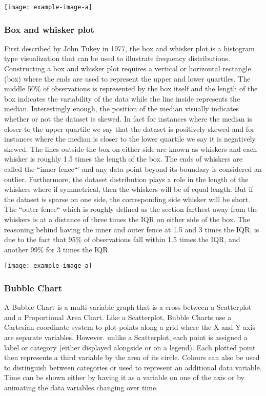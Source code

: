 \texttt{[image: example-image-a]} 

\subsubsection{Box and whisker plot}
First described by John Tukey in 1977, the box and whisker plot is a histogram
type visualization that can be used to illustrate frequency distributions. Constructing
a box and whisker plot requires a vertical or horizontal rectangle (box) where the 
ends are used to represent the upper and lower quartiles. The middle 50\% of observations 
is represented by the box itself and the length of the box indicates the variability 
of the data while the line inside represents the median. Interestingly enough, 
the position of the median visually indicates whether or not the dataset is skewed. 
In fact for instances where the median is closer to the upper quartile we say that 
the dataset is positively skewed and for instances where the median is closer to 
the lower quartile  we say it is negatively skewed. 
The lines outside the box on either side are known as whiskers and each whisker 
is roughly 1.5 times the length of the box. The ends of whiskers are called the 
``inner fence``' and any data point beyond its boundary is considered an outlier. 
Furthermore, the dataset distribution plays a role in the length of the whiskers 
where if symmetrical, then the whiskers will be of equal length. But if the dataset 
is sparse on one side, the corresponding side whisker will be short. The ``outer fence``
which is roughly defined as the section farthest away from the whiskers is at a 
distance of three times the IQR on either side of the box. The reasoning behind 
having the inner and outer fence at 1.5 and 3 times the IQR, is due to the fact 
that 95\% of observations fall within 1.5 times the IQR, and another 99\% for 3 
times the IQR.

\texttt{[image: example-image-a]} 

\subsubsection{Bubble Chart}
A Bubble Chart is a multi-variable graph that is a cross between a Scatterplot 
and a Proportional Area Chart. Like a Scatterplot, Bubble Charts use a Cartesian 
coordinate system to plot points along a grid where the X and Y axis are separate 
variables. However. unlike a Scatterplot, each point is assigned a label or 
category (either displayed alongside or on a legend). Each plotted point then 
represents a third variable by the area of its circle. Colours can also be used 
to distinguish between categories or used to represent an additional data variable. 
Time can be shown either by having it as a variable on one of the axis or by 
animating the data variables changing over time.

